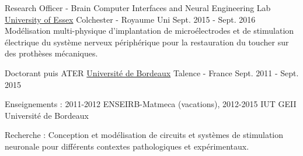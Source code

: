 \begin{cventries}
  \cventry
    {Research Officer - Brain Computer Interfaces and Neural Engineering Lab} %
    {\href{https://www.essex.ac.uk/departments/computer-science-and-electronic-engineering/research/brain-computer-interfaces-and-neural-engineering}{University of Essex}} %
    {Colchester - Royaume Uni} %
    {Sept. 2015 - Sept. 2016} %
    {
      Modélisation multi-physique d’implantation de microélectrodes et de stimulation électrique du système nerveux périphérique pour la restauration du toucher sur des prothèses mécaniques.
    }

  \cventry
    {Doctorant puis ATER} %
    {\href{https://www.u-bordeaux.fr}{Université de Bordeaux}} %
    {Talence - France} %
    {Sept. 2011 - Sept. 2015} %
    {
      \begin{cvitems} %
        \item {Enseignements : 2011-2012 ENSEIRB-Matmeca (vacations), 2012-2015 IUT GEII Université de Bordeaux}
        \item {Recherche : Conception et modélisation de circuits et systèmes de stimulation neuronale pour différents contextes pathologiques et expérimentaux.}
      \end{cvitems}
    }

\end{cventries}
